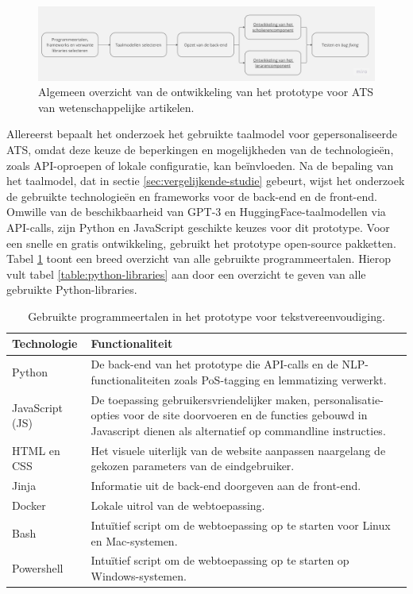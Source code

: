 \begin{figure}[H]
	\includegraphics[width=\linewidth]{img/flowchart-general-development.jpg}
	\caption{Algemeen overzicht van de ontwikkeling van het prototype voor ATS van wetenschappelijke artikelen.}
	\label{img:general-overview-prototype}
\end{figure}

Allereerst bepaalt het onderzoek het gebruikte taalmodel voor gepersonaliseerde ATS, omdat deze keuze de beperkingen en mogelijkheden van de technologieën, zoals API-oproepen of lokale configuratie, kan beïnvloeden. Na de bepaling van het taalmodel, dat in sectie \ref{sec:vergelijkende-studie} gebeurt, wijst het onderzoek de gebruikte technologieën en frameworks voor de back-end en de front-end. Omwille van de beschikbaarheid van GPT-3 en HuggingFace-taalmodellen via API-calls, zijn Python en JavaScript geschikte keuzes voor dit prototype. Voor een snelle en gratis ontwikkeling, gebruikt het prototype open-source pakketten. Tabel \ref{table:technologies} toont een breed overzicht van alle gebruikte programmeertalen. Hierop vult tabel \ref{table:python-libraries} aan door een overzicht te geven van alle gebruikte Python-libraries.

\begin{center}
	\begin{table}[H]
	\begin{tabular}{ | m{4cm} | m{11cm} | } 
		\hline
		\textbf{Technologie} 	& \textbf{Functionaliteit} \\
		\hline
		Python 					& De back-end van het prototype die API-calls en de NLP-functionaliteiten zoals PoS-tagging en lemmatizing verwerkt. \\
		\hline
		JavaScript (JS)				& De toepassing gebruikersvriendelijker maken, personalisatie-opties voor de site doorvoeren en de functies gebouwd in Javascript dienen als alternatief op commandline instructies. \\
		\hline
		HTML en CSS 			& Het visuele uiterlijk van de website aanpassen naargelang de gekozen parameters van de eindgebruiker. \\
		\hline
		Jinja 					& Informatie uit de back-end doorgeven aan de front-end.  \\
		\hline
		Docker 					& Lokale uitrol van de webtoepassing. \\
		\hline
		Bash					& Intuïtief script om de webtoepassing op te starten voor Linux en Mac-systemen. \\
		\hline
		Powershell 				& Intuïtief script om de webtoepassing op te starten op Windows-systemen. \\
		\hline
	\end{tabular}
	\caption{Gebruikte programmeertalen in het prototype voor tekstvereenvoudiging.}
	\label{table:technologies}
	\end{table}
\end{center}

